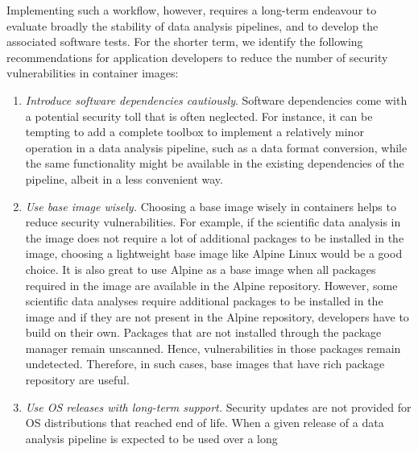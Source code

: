 Implementing such a workflow, however, requires a long-term endeavour to
evaluate broadly the stability of data analysis pipelines, and to develop
the associated software tests. For the shorter term, we identify the
following recommendations for application developers to reduce the number
of security vulnerabilities in container images:

\begin{enumerate}
\item \emph{Introduce software dependencies cautiously}. Software
dependencies come with a potential security toll that is often neglected.
For instance, it can be tempting to add a complete toolbox to implement a
relatively minor operation in a data analysis pipeline, such as a data
format conversion, while the same functionality might be available in the
existing dependencies of the pipeline, albeit in a less convenient way.
\item \emph{Use base image wisely.} Choosing a base image wisely in containers 
helps to reduce security vulnerabilities.
For example, if the scientific data analysis in the image does not require a lot of additional
packages to be installed in the image, choosing a lightweight base image like
Alpine Linux would be a good choice. It is also great to use Alpine as a base image
when all packages required in the image are available in the Alpine repository. 
However, some scientific data analyses
require additional packages to be installed in the image and if they are not
present in the Alpine repository, developers have to build on their own.
Packages that are not installed through the package manager remain unscanned. 
Hence, vulnerabilities in those packages remain
undetected. Therefore, in such cases, base images that have rich
package repository are useful.
\item \emph{Use OS releases with long-term support.} Security updates are
not provided for OS distributions that reached end of life. When a given
release of a data analysis pipeline is expected to be used over a long

\end{enumerate}
